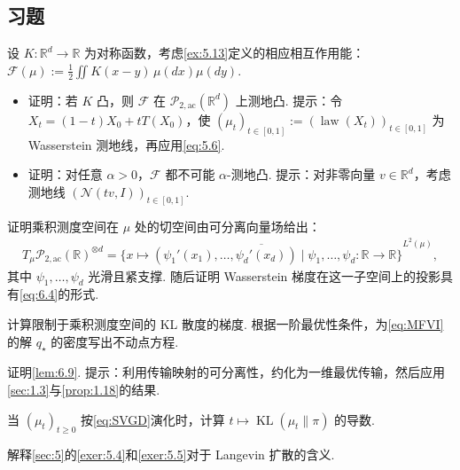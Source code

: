 \subsection{习题}\label{sec:6.8}

\begin{exercise}\label{exer:6.1}
设 $K:\mathbb R^d\to\mathbb R$ 为对称函数，考虑\autoref{ex:5.13}定义的相应相互作用能：$\mathcal F(\mu):=\frac12\iint K(x-y)\,\mu(dx)\mu(dy)$.
\begin{itemize}
\item 证明：若 $K$ 凸，则 $\mathcal F$ 在 $\mathcal P_{2,\mathrm{ac}}(\mathbb R^d)$ 上测地凸. 提示：令 $X_t=(1-t)X_0+tT(X_0)$，使 $(\mu_t)_{t\in[0,1]}:=(\operatorname{law}(X_t))_{t\in[0,1]}$ 为 Wasserstein 测地线，再应用\eqref{eq:5.6}.
\item 证明：对任意 $\alpha>0$，$\mathcal F$ 都不可能 $\alpha$-测地凸. 提示：对非零向量 $v\in\mathbb R^d$，考虑测地线 $(\mathcal N(tv,I))_{t\in[0,1]}$.
\end{itemize}
\end{exercise}

\begin{exercise}\label{exer:6.2}
证明乘积测度空间在 $\mu$ 处的切空间由可分离向量场给出：
$$
\begin{aligned}
T_\mu\mathcal P_{2,\mathrm{ac}}(\mathbb R)^{\otimes d}
=\overline{\{x\mapsto(\psi_1'(x_1),\ldots,\psi_d'(x_d))
\mid\psi_1,\ldots,\psi_d:\mathbb R\to\mathbb R\}}^{L^2(\mu)},
\end{aligned}
$$
其中 $\psi_1,\ldots,\psi_d$ 光滑且紧支撑. 随后证明 Wasserstein 梯度在这一子空间上的投影具有\eqref{eq:6.4}的形式.
\end{exercise}

\begin{exercise}\label{exer:6.3}
计算限制于乘积测度空间的 KL 散度的梯度. 根据一阶最优性条件，为\eqref{eq:MFVI}的解 $q_\star$ 的密度写出不动点方程.
\end{exercise}

\begin{exercise}\label{exer:6.4}
证明\autoref{lem:6.9}. 提示：利用传输映射的可分离性，约化为一维最优传输，然后应用\autoref{sec:1.3}与\autoref{prop:1.18}的结果.
\end{exercise}

\begin{exercise}\label{exer:6.5}
当 $(\mu_t)_{t\geq0}$ 按\eqref{eq:SVGD}演化时，计算 $t\mapsto\operatorname{KL}(\mu_t\|\pi)$ 的导数.
\end{exercise}

\begin{exercise}\label{exer:6.6}
解释\autoref{sec:5}的\autoref{exer:5.4}和\autoref{exer:5.5}对于 Langevin 扩散的含义.
\end{exercise}

